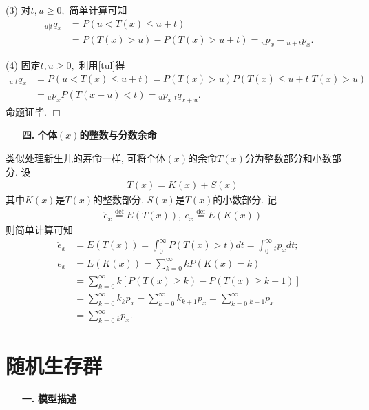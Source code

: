 \documentclass[a4paper,10pt]{ctexbook}
\newcommand{\hei}{\CJKfamily{hei}}      %
\def\qed{\hfill$\Box$\medskip}
\begin{document}
(3) 对$t,u\ge0,$ 简单计算可知
\begin{align*}
    {}_{u|t}q_x & =P(u<T(x)\leq u+t)                          \\
                & =P(T(x)>u)-P(T(x)>u+t)={}_up_x-{}_{u+t}p_x.
\end{align*}

(4) 固定$t,u\ge0,$ 利用\eqref{tul}得
\begin{align*}
    {}_{u|t}q_x & =P(u<T(x)\leq u+t)=P(T(x)>u)P(T(x)\leq u+t|T(x)>u) \\
                & ={}_up_xP(T(x+u)<t)= {}_up_x{}~_{t}q_{x+u}.
\end{align*}
命题证毕. \qed

\begin{itemize}
    \item[{\bf\hei 四.}]{\bf\hei 个体$(x)$的整数与分数余命}
\end{itemize}
类似处理新生儿的寿命一样, 可将个体$(x)$的余命$T(x)$分为整数部分和小数部分.
设
\begin{align*}
     & T(x)=K(x)+S(x)
\end{align*}
其中$K(x)$是$T(x)$的整数部分, $S(x)$是$T(x)$的小数部分. 记
\begin{align*}
     & \mathring{e}_x\stackrel{\text{def}}{=}E(T(x)), \   {e_x}\stackrel{\text{def}}{=}E(K(x))
\end{align*}
则简单计算可知 \begin{align*}
    \mathring{e}_x & =E(T(x))=\int_{0}^{\infty}P(T(x)>t)d t=\int_{0}^{\infty}{_tp_xdt};                          \\
    {e_x}          & =E(K(x))=\sum_{k=0}^{\infty}kP(K(x)=k)                                                      \\
                   & =\sum_{k=0}^{\infty}k[P(T(x)\geq k)-P(T(x)\geq k+1)]                                        \\
                   & =\sum_{k=0}^{\infty}k{}_kp_x-\sum_{k=0}^{\infty}k{}_{k+1}p_x=\sum_{k=0}^{\infty}{_{k+1}p_x} \\
                   & =\sum_{k=0}^{\infty}{_kp_x}.
\end{align*}

\section{随机生存群}
\begin{itemize}
    \item[{\bf\hei 一.}]{\bf\hei 模型描述}
\end{itemize}
\end{document}
